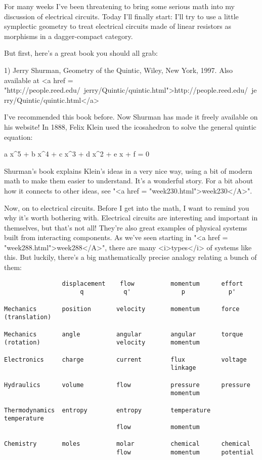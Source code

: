 

For many weeks I've been threatening to bring some serious math into
my discussion of electrical circuits.  Today I'll finally start: I'll
try to use a little symplectic geometry to treat electrical circuits
made of linear resistors as morphisms in a dagger-compact category.

But first, here's a great book you should all grab:

1) Jerry Shurman, Geometry of the Quintic, Wiley, New York, 1997. 
Also available at <a href = "http://people.reed.edu/~jerry/Quintic/quintic.html">http://people.reed.edu/~jerry/Quintic/quintic.html</a>

I've recommended this book before.  Now Shurman has made it
freely available on his website!  In 1888, Felix Klein used the
icosahedron to solve the general quintic equation:


 a x^{5} + b x^{4} + c x^{3} + d
x^{2} + e x + f = 0

Shurman's book explains Klein's ideas in a very nice way, using a
bit of modern math to make them easier to understand.  It's a
wonderful story.  For a bit about how it connects to other ideas, see
"<a href = "week230.html">week230</A>".

Now, on to electrical circuits.  Before I get into the math, I want to
remind you why it's worth bothering with.  Electrical circuits are
interesting and important in themselves, but that's not all!  They're
also great examples of physical systems built from interacting
components.  As we've seen starting in "<a href =
"week288.html">week288</A>", there are many <i>types</i> of systems
like this.  But luckily, there's a big mathematically precise analogy
relating a bunch of them:


\begin{verbatim}
                displacement    flow          momentum      effort
                     q           q'              p            p'

Mechanics       position       velocity       momentum      force
(translation)

Mechanics       angle          angular        angular       torque
(rotation)                     velocity       momentum

Electronics     charge         current        flux          voltage
                                              linkage

Hydraulics      volume         flow           pressure      pressure
                                              momentum

Thermodynamics  entropy        entropy        temperature   temperature
                               flow           momentum

Chemistry       moles          molar          chemical      chemical
                               flow           momentum      potential
\end{verbatim}
    

